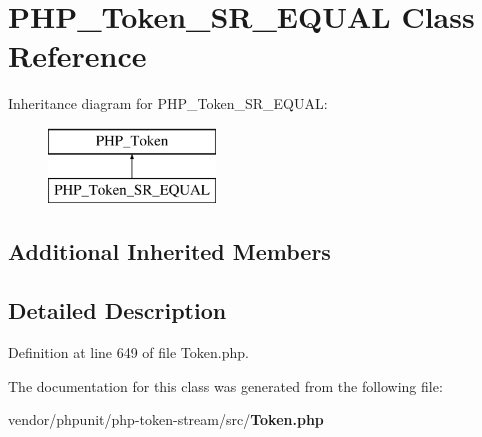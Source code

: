 \section{P\+H\+P\+\_\+\+Token\+\_\+\+S\+R\+\_\+\+E\+Q\+U\+A\+L Class Reference}
\label{class_p_h_p___token___s_r___e_q_u_a_l}
Inheritance diagram for P\+H\+P\+\_\+\+Token\+\_\+\+S\+R\+\_\+\+E\+Q\+U\+A\+L\+:\begin{figure}[H]
\begin{center}
\leavevmode
\includegraphics[height=2.000000cm]{class_p_h_p___token___s_r___e_q_u_a_l}
\end{center}
\end{figure}
\subsection*{Additional Inherited Members}


\subsection{Detailed Description}


Definition at line 649 of file Token.\+php.



The documentation for this class was generated from the following file\+:\begin{DoxyCompactItemize}
\item 
vendor/phpunit/php-\/token-\/stream/src/{\bf Token.\+php}\end{DoxyCompactItemize}

